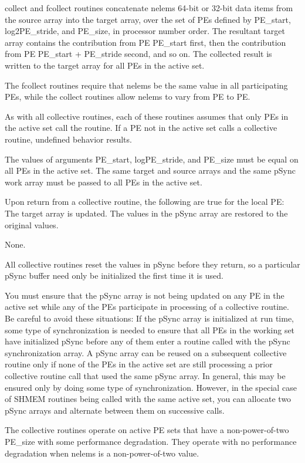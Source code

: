 {   
\OSH{} collect and fcollect routines concatenate
nelems 64-bit or 32-bit data items from the source array into the target
array, over the set of PEs defined by PE\_start, log2PE\_stride, and
PE\_size, in processor number order. The resultant target array
contains the contribution from PE PE\_start first, then the contribution
from PE PE\_start + PE\_stride second, and so on.  The collected result
is written to the target array for all PEs in the active set.

The fcollect routines require that nelems be the same value in all
participating PEs, while the collect routines allow nelems to vary from
PE to PE.

As with all \OSH{} collective routines, each of these routines assumes
that only PEs in the active set call the routine. If a PE not in the
active set calls a \OSH{} collective routine, undefined behavior
results.

The values of arguments PE\_start, logPE\_stride, and PE\_size must be
equal on all PEs in the active set. The same target and source arrays
and the same pSync work array must be passed to all PEs in the active
set.

Upon return from a collective routine, the following are true for the
local PE: The target array is updated. The values in the pSync array
are restored to the original values.
}
{
\desTB {}{}
    {None.}
}
{
All \OSH{} collective routines reset the values in pSync before they
return, so a particular pSync buffer need only be initialized the first
time it is used.

You  must ensure that the pSync array is not being updated on any PE in
the active set while any of the PEs participate in processing of a
\OSH{} collective routine. Be careful to avoid these situations: If the
pSync array is initialized at run time, some type of synchronization is
needed to ensure that all PEs in the working set have initialized pSync
before any of them  enter a \OSH{} routine called with the pSync
synchronization	array. A pSync array can be reused on a subsequent
\OSH{} collective routine only if none of the PEs in the active set  are
still processing a  prior \OSH{} collective routine call that used the
same pSync array. In general, this may be ensured only by doing some
type of synchronization. However, in the special case of SHMEM
routines being called with the same active set, you can allocate two
pSync arrays and alternate between them on successive calls.

The collective routines operate on active PE sets that have a
non-power-of-two PE\_size with some performance degradation. They
operate with no performance degradation when nelems is a
non-power-of-two value.
}
\eAPI 

